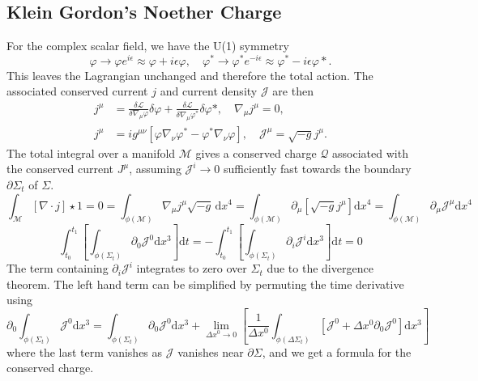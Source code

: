 \documentclass[11pt, oneside]{report}  %
\newcommand{\M}{\mathcal{M}}
\renewcommand{\L}{\mathcal{L}}
\newcommand{\vp}{\varphi}
\newcommand{\dd}{\mathrm{d}}
\numberwithin{equation}{section}
\begin{document}
\subsection{Klein Gordon's Noether Charge}
For the complex scalar field, we have the U(1) symmetry
\begin{equation}\vp \rightarrow \vp e^{i\epsilon} \approx \vp + i\epsilon \vp , \quad\vp^* \rightarrow \vp^* e^{-i\epsilon}  \approx \vp^* - i\epsilon \vp*.\end{equation}
This leaves the Lagrangian unchanged and therefore the total action. The associated conserved current $j$ and current density $\mathcal{J}$ are then
\begin{align*} j^\mu &= \frac{\delta \L}{\delta \nabla_\mu\vp}\delta \vp + \frac{\delta \L}{\delta \nabla_\mu \vp^*}\delta \vp*, \quad \nabla_\mu j^\mu =0,\\
 j^\mu &=  ig^{\mu\nu}\left[\vp\nabla_\nu\vp^* - \vp^*\nabla_\nu\vp\right], \quad \mathcal{J}^\mu = \sqrt{-g}j^\mu.\end{align*}
The total integral over a manifold $\M$ gives a conserved charge $\mathcal{Q}$ associated with the conserved current $J^\mu$, assuming $\mathcal{J}^i\rightarrow0$ sufficiently fast towards the boundary $\partial \Sigma_t$ of $\Sigma$.
\begin{equation}\int_\M \left[\nabla \cdot j\right] \star 1 = 0 = \int_{\phi(\M)} \nabla_\mu j^\mu \sqrt{-g}\,\dd x^4 = \int_{\phi(\M)} \partial_\mu \left[\sqrt{-g} j^{\mu} \right] \dd x^4= \int_{\phi(\M)}\partial_\mu \mathcal{J}^\mu \dd x^4\end{equation}
\begin{equation} \int^{t_1}_{t_0}\left[\int_{\phi(\Sigma_t)} \partial_0 \mathcal{J}^0 \dd x^3 \right]\dd t = -\int^{t_1}_{t_0}\left[\int_{\phi(\Sigma_t)} \partial_i \mathcal{J}^i \dd x^3 \right]\dd t = 0\end{equation}
The term containing $\partial_i\mathcal{J}^i$ integrates to zero over $\Sigma_t$ due to the divergence theorem. The left hand term can be simplified by permuting the time derivative using
\begin{equation} \partial_0 \int_{\phi(\Sigma_t)}\mathcal{J}^0 \dd x^3 = \int_{\phi(\Sigma_t)}\partial_0 \mathcal{J}^0 \dd x^3 + \lim_{\Delta x^0\rightarrow0}\left[ \frac{1}{\Delta x^0}\int_{\phi(\Delta \Sigma_t)}\left[ \mathcal{J}^0 +\Delta x^0 \partial_0 \mathcal{J}^0\right] \dd x^3 \right]\end{equation}
where the last term vanishes as $\mathcal{J}$ vanishes near $\partial\Sigma$, and we get a formula for the conserved charge.
\end{document}
